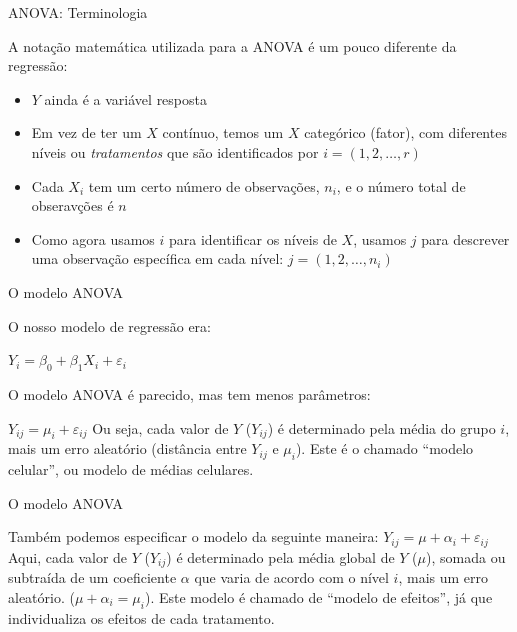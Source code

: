 \documentclass{beamer}\usepackage[]{graphicx}\usepackage[]{color}
\begin{document}
\begin{frame}{ANOVA: Terminologia}

A notação matemática utilizada para a ANOVA é um pouco diferente da regressão: \pause
\vfill
\begin{itemize}
  \item $Y$ ainda é a variável resposta  \pause
  \vfill
  \item Em vez de ter um $X$ contínuo, temos um $X$ categórico (fator), com diferentes níveis ou \emph{tratamentos} que são identificados por $i = (1,2,\ldots,r)$ \pause
  \vfill
  \item Cada $X_i$ tem um certo número de observações, $n_i$, e o número total de obseravções é $n$
    \vfill
  \item Como agora usamos $i$ para identificar os níveis de $X$, usamos $j$ para descrever uma observação específica em cada nível: $j = (1,2,\dots,n_i)$
\end{itemize}

\end{frame}


\begin{frame}{O modelo ANOVA}

O nosso modelo de regressão era:
\vfill

$Y_i = \beta _0 + \beta _1 X_i + \varepsilon_i$ \pause
\vfill

O modelo ANOVA é parecido, mas tem menos parâmetros:
\vfill

$Y_{ij} = \mu_i + \varepsilon _{ij}$ \pause
\vfill
Ou seja, cada valor de $Y$ ($Y_{ij}$) é determinado pela média do grupo $i$, mais um erro aleatório (distância entre $Y_{ij}$ e $\mu _i$). Este é o chamado ``modelo celular'', ou modelo de médias celulares.

\end{frame}

\begin{frame}{O modelo ANOVA}

Também podemos especificar o modelo da seguinte maneira:
\vfill
$Y_{ij} = \mu + \alpha _i + \varepsilon _{ij}$ \pause
\vfill
Aqui, cada valor de $Y$ ($Y_{ij}$) é determinado pela média global de $Y$ ($\mu$), somada ou subtraída de um coeficiente $\alpha$ que varia de acordo com o nível $i$, mais um erro aleatório. ($\mu + \alpha _i = \mu _i$). \pause
\vfill
Este modelo é chamado de ``modelo de efeitos'', já que individualiza os efeitos de cada tratamento.

\end{frame}
\end{document}
